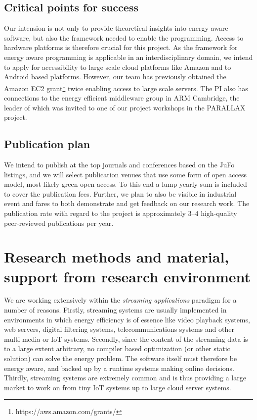 \documentclass{article}
\begin{document}
\subsection{Critical points for success}
Our intension is not only to provide theoretical insights into energy aware software, but also the framework needed to enable the programming.
Access to hardware platforms is therefore crucial for this project.
As the framework for energy aware programming is applicable in an interdisciplinary domain, we intend to apply for accessibility to large scale cloud platforms like Amazon and to Android based platforms.
However, our team has previously obtained the Amazon EC2 grant\footnote{https://aws.amazon.com/grants/} twice enabling access to large scale servers.
The PI also has connections to the energy efficient middleware group in ARM Cambridge, the leader of which was invited to one of our project workshops in the PARALLAX project.

\subsection{Publication plan}
We intend to publish at the top journals and conferences based on the JuFo listings, and we will select publication venues that use some form of open access model, most likely green open access. 
To this end a lump yearly sum is included to cover the publication fees. 
Further, we plan to also be visible in industrial event and fares to both demonstrate and get feedback on our research work.
The publication rate with regard to the project is approximately 3--4 high-quality peer-reviewed publications per year.

\section{Research methods and material, support from research environment}

We are working extensively within the \textit{streaming applications} paradigm for a number of reasons. 
Firstly, streaming systems are usually implemented in environments in which energy efficiency is of essence like video playback systems, web servers, digital filtering systems, telecommunications systems and other multi-media or IoT systems. 
Secondly, since the content of the streaming data is to a large extent arbitrary, no compiler based optimization (or other static solution) can solve the energy problem. 
The software itself must therefore be energy aware, and backed up by a runtime systems making online decisions. 
Thirdly, streaming systems are extremely common and is thus providing a large market to work on from tiny IoT systems up to large cloud server systems.
\end{document}
